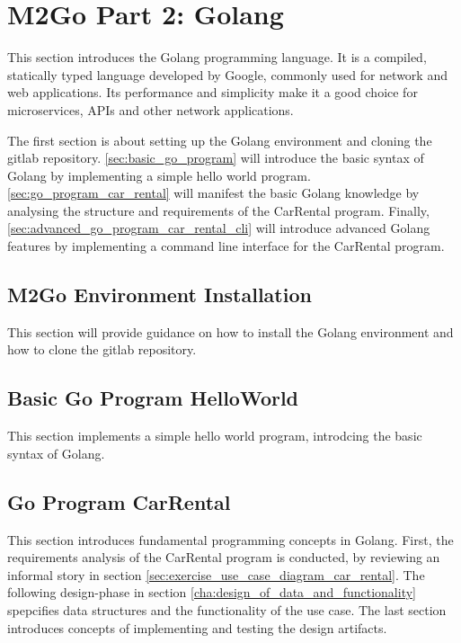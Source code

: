\chapter{M2Go Part 2: Golang}
\label{cha:golang}
This section introduces the Golang programming language.
It is a compiled, statically typed language developed by Google, commonly used for network and web applications.
Its performance and simplicity make it a good choice for microservices, APIs and other network applications.

The first section is about setting up the Golang environment and cloning the gitlab repository.
\autoref{sec:basic_go_program} will introduce the basic syntax of Golang by implementing a simple hello world program.
\autoref{sec:go_program_car_rental} will manifest the basic Golang knowledge by analysing the structure and requirements of the CarRental program.
Finally, \autoref{sec:advanced_go_program_car_rental_cli} will introduce advanced Golang features by implementing a command line interface for the CarRental program.


\section{M2Go Environment Installation}
\label{sec:m2go_env_installation}
This section will provide guidance on how to install the Golang environment and how to clone the gitlab repository.





\section{Basic Go Program HelloWorld}
\label{sec:basic_go_program}
This section implements a simple hello world program, introdcing the basic syntax of Golang.




\section{Go Program CarRental}
\label{sec:go_program_car_rental}
This section introduces fundamental programming concepts in Golang.
First, the requirements analysis of the CarRental program is conducted, by reviewing an informal story in section \ref{sec:exercise_use_case_diagram_car_rental}.
The following design-phase in section \ref{cha:design_of_data_and_functionality} spepcifies data structures and the functionality of the use case.
The last section introduces concepts of implementing and testing the design artifacts.

